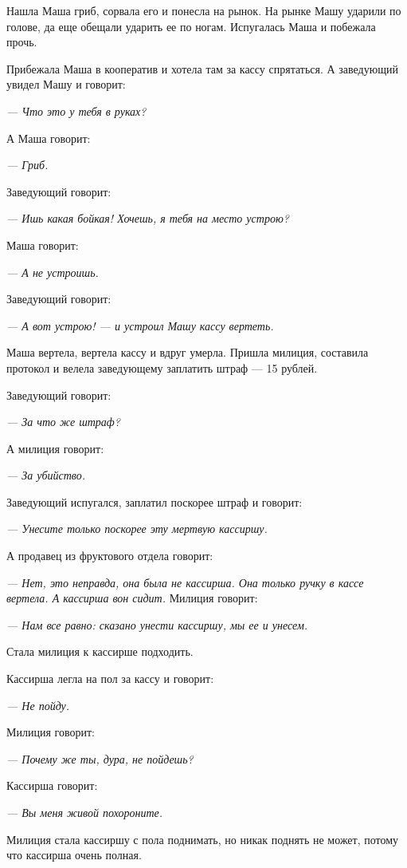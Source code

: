 Нашла Маша гриб, сорвала его и понесла на рынок. На рынке Машу ударили по голове, да еще обещали ударить ее по ногам. Испугалась Маша и побежала прочь.

Прибежала Маша в кооператив и хотела там за кассу спрятаться. А заведующий увидел Машу и говорит:

\textit{--- Что это у тебя в руках?}

А Маша говорит:

\textit{--- Гриб.}

Заведующий говорит:

\textit{--- Ишь какая бойкая! Хочешь, я тебя на место устрою?}

Маша говорит:

\textit{--- А не устроишь.}

Заведующий говорит:

\textit{--- А вот устрою! --- и устроил Машу кассу вертеть.}

Маша вертела, вертела кассу и вдруг умерла. Пришла милиция, составила протокол и велела заведующему заплатить штраф --- 15 рублей.

Заведующий говорит:

\textit{--- За что же штраф?}

А милиция говорит:

\textit{--- За убийство.}

Заведующий испугался, заплатил поскорее штраф и говорит:

\textit{--- Унесите только поскорее эту мертвую кассиршу.}

А продавец из фруктового отдела говорит:

\textit{--- Нет, это неправда, она была не кассирша. Она только ручку в кассе вертела. А кассирша вон сидит.}
Милиция говорит:

\textit{--- Нам все равно: сказано унести кассиршу, мы ее и унесем.}

Стала милиция к кассирше подходить.

Кассирша легла на пол за кассу и говорит:

\textit{--- Не пойду.}

Милиция говорит:

\textit{--- Почему же ты, дура, не пойдешь?}

Кассирша говорит:

\textit{--- Вы меня живой похороните.}

Милиция стала кассиршу с пола поднимать, но никак поднять не может, потому что кассирша очень полная.

